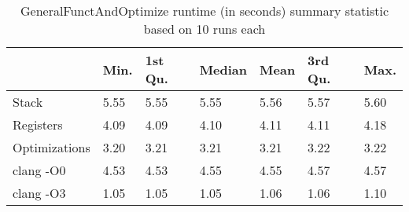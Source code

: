 \begin{table}[h!]
\centering
\begin{tabular}{p{}p{}p{}p{}p{}p{}p{}}
  \hline
 & Min. & 1st Qu. & Median & Mean & 3rd Qu. & Max. \\ 
  \hline
Stack & 5.55 & 5.55 & 5.55 & 5.56 & 5.57 & 5.60 \\ 
  Registers & 4.09 & 4.09 & 4.10 & 4.11 & 4.11 & 4.18 \\ 
  Optimizations & 3.20 & 3.21 & 3.21 & 3.21 & 3.22 & 3.22 \\ 
  clang -O0 & 4.53 & 4.53 & 4.55 & 4.55 & 4.57 & 4.57 \\ 
  clang -O3 & 1.05 & 1.05 & 1.05 & 1.06 & 1.06 & 1.10 \\ 
   \hline
\end{tabular}
\caption{GeneralFunctAndOptimize runtime (in seconds) summary statistic based on 10 runs each}
\end{table}
